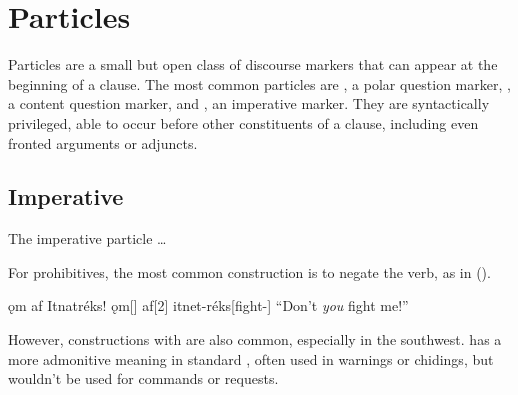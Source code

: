 \setchapterpreamble[u]{\margintoc}
\chapter{Particles}
Particles are a small but open class of discourse markers that can appear at the beginning of a clause. The most common particles are , a polar question marker, , a content question marker, and , an imperative marker. They are syntactically privileged, able to occur before other constituents of a clause, including even fronted arguments or adjuncts.

\section{Imperative}
The imperative particle  \dots

For prohibitives, the most common construction is to negate the verb, as in (\nextx).

\begin{gloss}
    \begingl 
        \glpreamble ǫm af Itnatréks! \endpreamble
        ǫm[]
        af[2]
        itnet-réks[fight-]
        \glft “Don't \emph{you} fight me!”
    \endgl
\end{gloss}

However, constructions with  are also common, especially in the southwest.  has a more admonitive meaning in standard \langname{}, often used in warnings or chidings, but wouldn't be used for commands or requests. 

